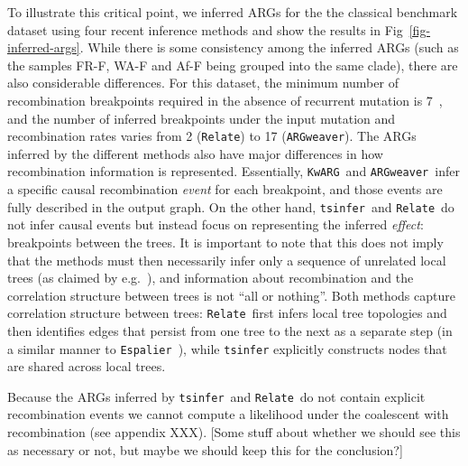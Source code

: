 \documentclass{article}
\newcommand{\tsinfer}[0]{\texttt{tsinfer}}
\newcommand{\kwarg}[0]{\texttt{KwARG}}
\newcommand{\argweaver}[0]{\texttt{ARGweaver}}
\newcommand{\relate}[0]{\texttt{Relate}}
\newcommand{\espalier}[0]{\texttt{Espalier}}
\begin{document}
To illustrate this critical point, we inferred ARGs for the
the classical \citet{kreitman1983nucleotide} benchmark dataset
using four recent inference methods and show the results in
Fig~\ref{fig-inferred-args}.
While there is some consistency among the inferred ARGs (such as the samples
FR-F, WA-F and Af-F being grouped into the same clade), there
are also considerable differences. For this dataset, the minimum number
of recombination breakpoints required in the absence of recurrent mutation
is 7~\citep{song2003parsimonious}, and the number of inferred breakpoints
under the input mutation and recombination rates
varies from 2 (\relate) to 17 (\argweaver).
The ARGs inferred by the different methods also have major differences
in how recombination information is represented. Essentially,
\kwarg\ and \argweaver\ infer a specific causal recombination \emph{event}
for each breakpoint, and those events are fully
described in the output graph. On the other hand, \tsinfer\ and
\relate\ do not infer causal events but instead focus on
representing the inferred \emph{effect}: breakpoints between the
trees. It is important to note that this does not imply that
the methods must then necessarily infer only a sequence of
unrelated local trees
(as claimed by e.g.~\citet{hejase2020summary}),
and information about recombination and the correlation structure
between trees is not ``all or nothing''.
Both methods capture correlation structure between trees:
\relate\ first infers local tree topologies and then identifies edges
that persist from one tree to the next as a separate step
(in a similar manner to \espalier~\citep{rasmussen2022espalier}), while
\texttt{tsinfer} explicitly constructs nodes that are shared across local
trees.

Because the ARGs inferred by \tsinfer\ and \relate\ do not contain
explicit recombination events we cannot compute a likelihood
under the coalescent with recombination (see appendix XXX).
[Some stuff about whether we should see this as necessary or not,
but maybe we should keep this for the conclusion?]
\end{document}
